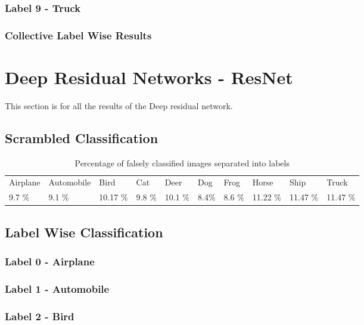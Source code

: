 \subsubsection{Label 9 - Truck}
\FloatBarrier
\subsubsection{Collective Label Wise Results}
\FloatBarrier

\section{Deep Residual Networks - ResNet}
This section is for all the results of the Deep residual network.
\subsection{Scrambled Classification}
\FloatBarrier

\begin{table}[]
	\centering
	\caption{Percentage of falsely classified images separated into labels }
	\label{table:falseclasRes}
	\begin{tabular}{llllllllll}
		Airplane & Automobile & Bird     & Cat    & Deer     & Dog     & Frog   & Horse    & Ship         & Truck         \\
		9.7 \%  & 9.1 \%    & 10.17 \% & 9.8 \% & 10.1 \% & 8.4\% & 8.6 \% & 11.22 \% & 11.47 \% & 11.47 \%
	\end{tabular}
\end{table}
\FloatBarrier
\subsection{Label Wise Classification}
\subsubsection{Label 0 - Airplane}
\subsubsection{Label 1 - Automobile}
\subsubsection{Label 2 - Bird}
